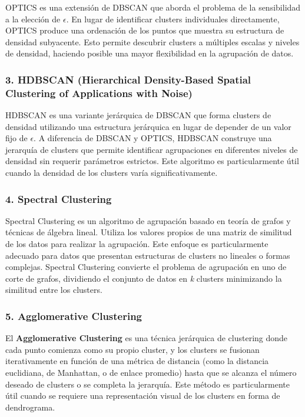OPTICS es una extensión de DBSCAN que aborda el problema de la sensibilidad a la elección de \(\epsilon\). En lugar de identificar clusters individuales directamente, OPTICS produce una ordenación de los puntos que muestra su estructura de densidad subyacente. Esto permite descubrir clusters a múltiples escalas y niveles de densidad, haciendo posible una mayor flexibilidad en la agrupación de datos.

\subsubsection*{3. HDBSCAN (Hierarchical Density-Based Spatial Clustering of Applications with Noise)}

HDBSCAN es una variante jerárquica de DBSCAN que forma clusters de densidad utilizando una estructura jerárquica en lugar de depender de un valor fijo de \(\epsilon\). A diferencia de DBSCAN y OPTICS, HDBSCAN construye una jerarquía de clusters que permite identificar agrupaciones en diferentes niveles de densidad sin requerir parámetros estrictos. Este algoritmo es particularmente útil cuando la densidad de los clusters varía significativamente.

\subsubsection*{4. Spectral Clustering}

Spectral Clustering es un algoritmo de agrupación basado en teoría de grafos y técnicas de álgebra lineal. Utiliza los valores propios de una matriz de similitud de los datos para realizar la agrupación. Este enfoque es particularmente adecuado para datos que presentan estructuras de clusters no lineales o formas complejas. Spectral Clustering convierte el problema de agrupación en uno de corte de grafos, dividiendo el conjunto de datos en \textit{k} clusters minimizando la similitud entre los clusters.

\subsubsection*{5. Agglomerative Clustering}

El \textbf{Agglomerative Clustering} es una técnica jerárquica de clustering donde cada punto comienza como su propio cluster, y los clusters se fusionan iterativamente en función de una métrica de distancia (como la distancia euclidiana, de Manhattan, o de enlace promedio) hasta que se alcanza el número deseado de clusters o se completa la jerarquía. Este método es particularmente útil cuando se requiere una representación visual de los clusters en forma de dendrograma.

